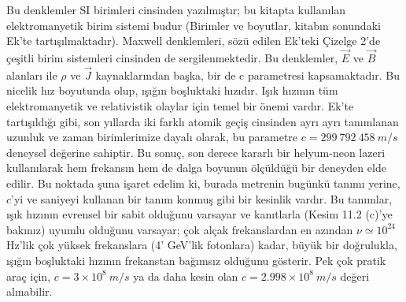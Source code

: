 Bu denklemler SI birimleri cinsinden yazılmıştır; bu kitapta kullanılan elektromanyetik birim sistemi budur (Birimler ve boyutlar, kitabın sonundaki Ek'te tartışılmaktadır). Maxwell denklemleri, sözü edilen Ek'teki Çizelge 2'de çeşitli birim sistemleri cinsinden de sergilenmektedir. Bu denklemler, $\Vec{E}$ ve $\Vec{B}$ alanları ile $\rho$ ve $\Vec{J}$ kaynaklarından başka, bir de c parametresi kapsamaktadır. Bu nicelik hız boyutunda olup, ışığın boşluktaki hızıdır. Işık hızının tüm elektromanyetik ve relativistik olaylar için temel bir önemi vardır. Ek'te tartışıldığı gibi, son yıllarda iki farklı atomik geçiş cinsinden ayrı ayrı tanımlanan uzunluk ve zaman birimlerimize dayalı olarak, bu parametre $ c=299 \ 792 \ 458 \ m/s$ deneysel değerine sahiptir. Bu sonuç, son derece kararlı bir helyum-neon lazeri kullanılarak hem frekansın hem de dalga boyunun ölçüldüğü bir deneyden elde edilir. Bu noktada şuna işaret edelim ki, burada metrenin bugünkü tanımı yerine, $c$'yi ve saniyeyi kullanan bir tanım konmuş gibi bir kesinlik vardır. Bu tanımlar, ışık hızının evrensel bir sabit olduğunu varsayar ve kanıtlarla (Kesim 11.2 (c)'ye bakınız) uyumlu olduğunu varsayar; çok alçak frekanslardan en azından $ \nu \simeq 10^{24}$ Hz'lik çok yüksek frekanslara (4' GeV'lik fotonlara) kadar, büyük bir doğrulukla, ışığın boşluktaki hızının frekanstan bağımsız olduğunu gösterir. Pek çok pratik araç için, $ c = 3 \times 10^{8} \ m/s$ ya da daha kesin olan $c = 2.998 \times 10^{8} \ m/s$ değeri alınabilir.

\

